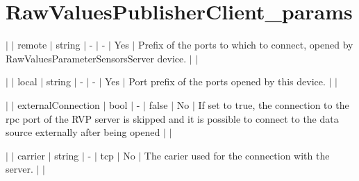 \chapter{Raw\+Values\+Publisher\+Client\+\_\+params }
\hypertarget{md_icub-main_2src_2libraries_2icubmod_2rawValuesPublisherClient_2RawValuesPublisherClient__params}{}\label{md_icub-main_2src_2libraries_2icubmod_2rawValuesPublisherClient_2RawValuesPublisherClient__params}

\begin{DoxyItemize}
\item \texorpdfstring{$\vert$}{|} \texorpdfstring{$\vert$}{|} remote \texorpdfstring{$\vert$}{|} string \texorpdfstring{$\vert$}{|} -\/ \texorpdfstring{$\vert$}{|} -\/ \texorpdfstring{$\vert$}{|} Yes \texorpdfstring{$\vert$}{|} Prefix of the ports to which to connect, opened by Raw\+Values\+Parameter\+Sensors\+Server device. \texorpdfstring{$\vert$}{|} \texorpdfstring{$\vert$}{|}
\item \texorpdfstring{$\vert$}{|} \texorpdfstring{$\vert$}{|} local \texorpdfstring{$\vert$}{|} string \texorpdfstring{$\vert$}{|} -\/ \texorpdfstring{$\vert$}{|} -\/ \texorpdfstring{$\vert$}{|} Yes \texorpdfstring{$\vert$}{|} Port prefix of the ports opened by this device. \texorpdfstring{$\vert$}{|} \texorpdfstring{$\vert$}{|}
\item \texorpdfstring{$\vert$}{|} \texorpdfstring{$\vert$}{|} external\+Connection \texorpdfstring{$\vert$}{|} bool \texorpdfstring{$\vert$}{|} -\/ \texorpdfstring{$\vert$}{|} false \texorpdfstring{$\vert$}{|} No \texorpdfstring{$\vert$}{|} If set to true, the connection to the rpc port of the RVP server is skipped and it is possible to connect to the data source externally after being opened \texorpdfstring{$\vert$}{|} \texorpdfstring{$\vert$}{|}
\item \texorpdfstring{$\vert$}{|} \texorpdfstring{$\vert$}{|} carrier \texorpdfstring{$\vert$}{|} string \texorpdfstring{$\vert$}{|} -\/ \texorpdfstring{$\vert$}{|} tcp \texorpdfstring{$\vert$}{|} No \texorpdfstring{$\vert$}{|} The carier used for the connection with the server. \texorpdfstring{$\vert$}{|} \texorpdfstring{$\vert$}{|} 
\end{DoxyItemize}